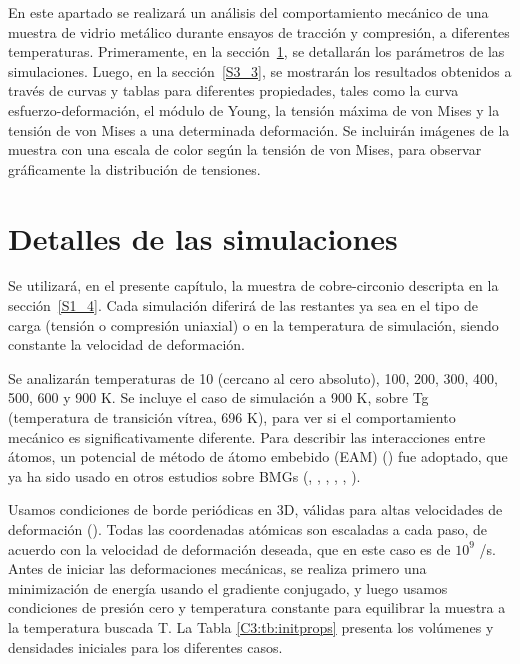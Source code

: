 En este apartado se realizará un análisis del comportamiento mecánico de una muestra de vidrio metálico durante ensayos de tracción y compresión, a diferentes temperaturas. Primeramente, en la sección~\ref{S3_2}, se detallarán los parámetros de las simulaciones. Luego, en la sección~\ref{S3_3}, se mostrarán los resultados obtenidos a través de curvas y tablas para diferentes propiedades, tales como la curva esfuerzo-deformación, el módulo de Young, la tensión máxima de von Mises y la tensión de von Mises a una determinada deformación.
Se incluirán imágenes de la muestra con una escala de color según la tensión de von Mises, para observar gráficamente la distribución de tensiones.

\section{Detalles de las simulaciones}
\label{S3_2}

Se utilizará, en el presente capítulo, la muestra de cobre-circonio descripta en la sección~\ref{S1_4}. Cada simulación diferirá de las restantes ya sea en el tipo de carga (tensión o compresión uniaxial) o en la temperatura de simulación, siendo constante la velocidad de deformación.

Se analizarán temperaturas de 10 (cercano al cero absoluto), 100, 200, 300, 400, 500, 600 y 900 K. Se incluye el caso de simulación a 900 K, sobre Tg (temperatura de transición vítrea, 696 K), para ver si el comportamiento mecánico es significativamente diferente. Para describir las interacciones entre átomos, un potencial de método de átomo embebido (EAM) (\cite{daw84}) fue adoptado, que ya ha sido usado en otros estudios sobre BMGs (\cite{shimizu07}, \cite{cao09}, \cite{cheng08}, \cite{arman10}, \cite{cheng11}, \cite{wang12}).

Usamos condiciones de borde periódicas en 3D, válidas para altas velocidades de deformación (\cite{bringa05}). Todas las coordenadas atómicas son escaladas a cada paso, de acuerdo con la velocidad de deformación deseada, que en este caso es de $10^9$ /s. Antes de iniciar las deformaciones mecánicas, se realiza primero una minimización de energía usando el gradiente conjugado, y luego usamos condiciones de presión cero y temperatura constante para equilibrar la muestra a la temperatura buscada T. La Tabla \ref{C3:tb:initprops} presenta los volúmenes y densidades iniciales para los diferentes casos.

